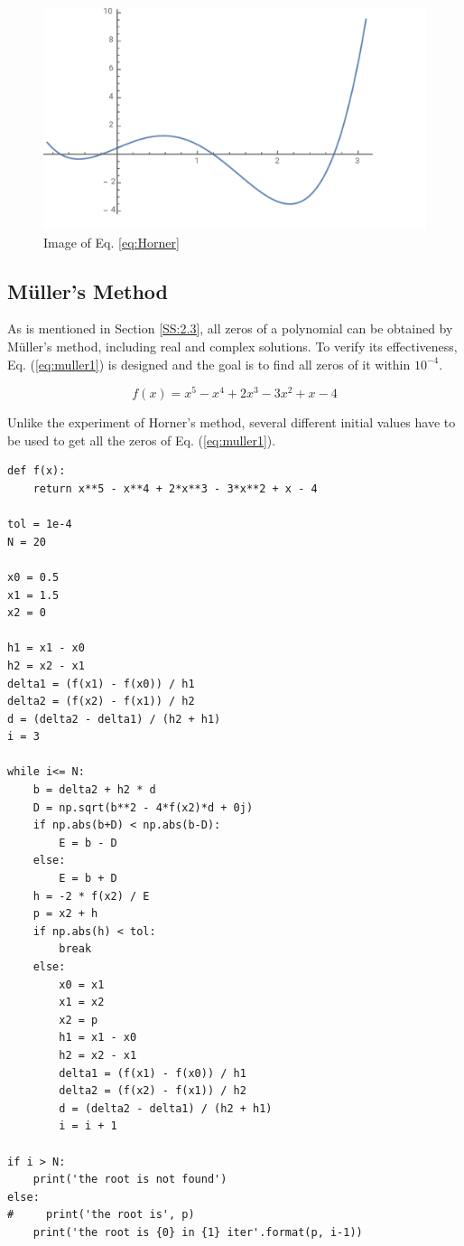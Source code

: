\documentclass[preprint,12pt]{elsarticle}
\begin{document}
\begin{figure}
\centering\includegraphics[width=0.8\linewidth]{Fig_poly_1.png}
\caption{Image of Eq. \ref{eq:Horner}}
\label{fig:poly1}
\end{figure}

\subsection{M\"uller's Method}

As is mentioned in Section \ref{SS:2.3}, all zeros of a polynomial can be obtained by M\"uller's method, including real and complex solutions. To verify its effectiveness, Eq. (\ref{eq:muller1}) is designed and the goal is to find all zeros of it within $10^{-4}$.

\begin{equation}
    f(x)=x^5-x^4+2x^3-3x^2+x-4
\label{eq:muller1}
\end{equation}

Unlike the experiment of Horner's method, several different initial values have to be used to get all the zeros of Eq. (\ref{eq:muller1}). 

\begin{lstlisting}
def f(x):
    return x**5 - x**4 + 2*x**3 - 3*x**2 + x - 4

tol = 1e-4
N = 20

x0 = 0.5
x1 = 1.5
x2 = 0

h1 = x1 - x0
h2 = x2 - x1
delta1 = (f(x1) - f(x0)) / h1
delta2 = (f(x2) - f(x1)) / h2
d = (delta2 - delta1) / (h2 + h1)
i = 3

while i<= N:
    b = delta2 + h2 * d
    D = np.sqrt(b**2 - 4*f(x2)*d + 0j)
    if np.abs(b+D) < np.abs(b-D):
        E = b - D
    else:
        E = b + D
    h = -2 * f(x2) / E
    p = x2 + h
    if np.abs(h) < tol:
        break
    else:
        x0 = x1
        x1 = x2
        x2 = p
        h1 = x1 - x0
        h2 = x2 - x1
        delta1 = (f(x1) - f(x0)) / h1
        delta2 = (f(x2) - f(x1)) / h2
        d = (delta2 - delta1) / (h2 + h1)
        i = i + 1

if i > N:
    print('the root is not found')
else:
#     print('the root is', p)
    print('the root is {0} in {1} iter'.format(p, i-1))
\end{lstlisting}
\end{document}

